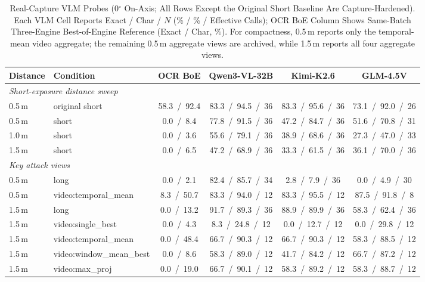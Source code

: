 \documentclass{ieeeaccess}
\begin{document}
\begin{table}[!t]
\caption{Real-Capture VLM Probes (0$^{\circ}$ On-Axis; All Rows Except the Original Short Baseline Are Capture-Hardened). Each VLM Cell Reports Exact / Char / $N$ (\% / \% / Effective Calls); OCR BoE Column Shows Same-Batch Three-Engine Best-of-Engine Reference (Exact / Char, \%). For compactness, 0.5\,m reports only the temporal-mean video aggregate; the remaining 0.5\,m aggregate views are archived, while 1.5\,m reports all four aggregate views.}
\label{tab:real_vlm}
\centering
\footnotesize
\setlength{\tabcolsep}{4.2pt}
\begin{tabular}{llcccc}
\toprule
Distance & Condition & OCR BoE & Qwen3-VL-32B & Kimi-K2.6 & GLM-4.5V \\
\midrule
\multicolumn{6}{l}{\textit{Short-exposure distance sweep}}\\
\midrule
0.5\,m & original short & 58.3~/~92.4 & 83.3~/~94.5~/~36 & 83.3~/~95.6~/~36 & 73.1~/~92.0~/~26 \\
0.5\,m & short & 0.0~/~8.4 & 77.8~/~91.5~/~36 & 47.2~/~84.7~/~36 & 51.6~/~70.8~/~31 \\
1.0\,m & short & 0.0~/~3.6 & 55.6~/~79.1~/~36 & 38.9~/~68.6~/~36 & 27.3~/~47.0~/~33 \\
1.5\,m & short & 0.0~/~6.5 & 47.2~/~68.9~/~36 & 33.3~/~61.5~/~36 & 36.1~/~70.0~/~36 \\
\midrule
\multicolumn{6}{l}{\textit{Key attack views}}\\
\midrule
0.5\,m & long & 0.0~/~2.1 & 82.4~/~85.7~/~34 & 2.8~/~7.9~/~36 & 0.0~/~4.9~/~30 \\
0.5\,m & video:temporal\_mean & 8.3~/~50.7 & 83.3~/~94.0~/~12 & 83.3~/~95.5~/~12 & 87.5~/~91.8~/~8 \\
1.5\,m & long & 0.0~/~13.2 & 91.7~/~89.3~/~36 & 88.9~/~89.9~/~36 & 58.3~/~62.4~/~36 \\
1.5\,m & video:single\_best & 0.0~/~4.3 & 8.3~/~24.8~/~12 & 0.0~/~12.7~/~12 & 0.0~/~29.8~/~12 \\
1.5\,m & video:temporal\_mean & 0.0~/~48.4 & 66.7~/~90.3~/~12 & 66.7~/~90.3~/~12 & 58.3~/~88.5~/~12 \\
1.5\,m & video:window\_mean\_best & 0.0~/~8.6 & 58.3~/~89.0~/~12 & 41.7~/~84.2~/~12 & 66.7~/~87.2~/~12 \\
1.5\,m & video:max\_proj & 0.0~/~19.0 & 66.7~/~90.1~/~12 & 58.3~/~89.2~/~12 & 58.3~/~88.7~/~12 \\
\bottomrule
\end{tabular}
\end{table}
\end{document}
